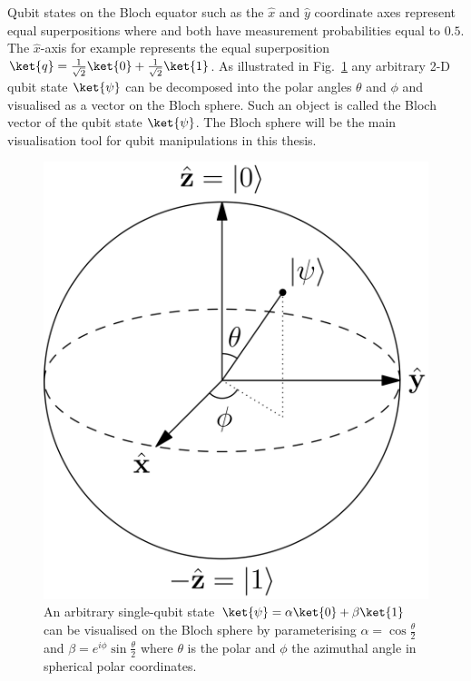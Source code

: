 Qubit states on the Bloch equator such as the $\hat{x}$ and $\hat{y}$ coordinate axes represent equal superpositions where \0 and \1 both have measurement probabilities equal to $0.5$. The $\hat{x}$-axis for example represents the equal superposition $\ket{q} = \frac{1}{\sqrt{2}} \ket{0} + \frac{1}{\sqrt{2}} \ket{1}$. As illustrated in Fig.~\ref{fig:blochsphere} any arbitrary 2-D qubit state $\ket{\psi}$ can be decomposed into the polar angles $\theta$ and $\phi$ and visualised as a vector on the Bloch sphere. Such an object is called the Bloch vector of the qubit state $\ket{\psi}$. The Bloch sphere will be the main visualisation tool for qubit manipulations in this thesis.

\begin{figure}[!ht]
       \centering
       \includegraphics[scale=0.11]{img/blochsphere.png}
       \caption[]{\label{fig:blochsphere} An arbitrary single-qubit state $\ket{\psi} = \alpha \ket{0} + \beta \ket{1}$ can be visualised on the Bloch sphere by parameterising $\alpha = \cos\frac{\theta}{2}$ and $\beta = e^{i \phi} \sin\frac{\theta}{2}$ where $\theta$ is the polar and $\phi$ the azimuthal angle in spherical polar coordinates.\footnotemark[2]}
\end{figure}


